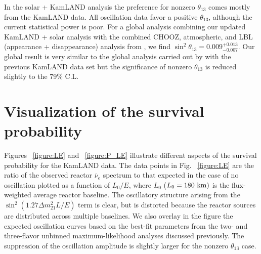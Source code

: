 \documentclass[aps,prc,twocolumn,groupedaddress,showpacs,amsmath,amssymb,floatfix,superscriptaddress]{revtex4}
\begin{document}
In the solar + KamLAND analysis the preference for nonzero $\theta_{13}$ comes mostly from the KamLAND data.
All oscillation data favor a positive $\theta_{13}$, although the current statistical power is poor.
For a global analysis combining our updated KamLAND + solar analysis with the combined CHOOZ, atmospheric, and LBL (appearance + disappearance) analysis from \cite{Garcia2010a}, we find $\sin^{2} \theta_{13} = 0.009^{+0.013}_{-0.007}$. Our global result is very similar to the global analysis carried out by \cite{Garcia2010a} with the previous KamLAND data set but the significance of nonzero $\theta_{13}$ is reduced slightly to the 79\% C.L. 

\section{ Visualization of  the survival probability}
\label{section:vis}
Figures ~\ref{figure:LE} and  ~\ref{figure:P_LE} illustrate different aspects of the survival probability for the KamLAND data.  The data points in Fig. ~\ref{figure:LE} are the ratio of the observed reactor $\overline{\nu}_{e}$ spectrum to that expected in the case of no oscillation plotted as a function of $L_{0}/E$, where $L_{0}$ ($L_{0} = 180~\rm{km})$ is the flux-weighted average reactor baseline. The oscillatory structure arising from the $\sin^2(1.27 \Delta m^{2}_{21}L/E)$ term is clear, but is distorted because the reactor sources are distributed across multiple baselines.  We also overlay in the figure the expected oscillation curves based on the best-fit parameters from the two- and three-flavor unbinned maximum-likelihood analyses discussed previously. The suppression of the oscillation amplitude is slightly larger for the nonzero $\theta_{13}$ case. 
\end{document}
